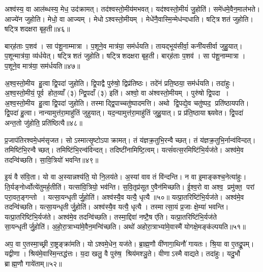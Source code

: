 अश्व॑स्य॒ वा आल॑ब्धस्य॒ मेध॒ उद॑क्रामत्।
तद॑श्वस्तो॒मीय॑मभवत्।
यद॑श्वस्तो॒मीयं॑ जु॒होति॑।
समे॑धमे॒वैन॒माल॑भते।
आज्ये॑न जुहोति।
मेधो॒ वा आज्यम्।
मेधोऽश्वस्तो॒मीयम्।
मेधे॑नै॒वास्मि॒न्मेध॑न्दधाति।
षट्त्रिशतं जुहोति।
षट्त्रिशदक्षरा बृह॒ती॥४६॥

बार्‌ह॑ताः प॒शव॑।
सा प॑शू॒नाम्मात्रा।
प॒शूने॒व मात्र॑या॒ सम॑र्धयति।
तायद्भूय॑सीर्वा॒ कनी॑यसीर्वा जुहु॒यात्।
प॒शून्मात्र॑या॒ व्य॑र्धयेत्।
षट्त्रिशतं जुहोति।
षट्त्रिशदक्षरा बृह॒ती।
बार्‌ह॑ताः प॒शव॑।
सा प॑शू॒नाम्मात्रा।
प॒शूने॒व मात्र॑या॒ सम॑र्धयति॥४७॥

अ॒श्व॒स्तो॒मीय हु॒त्वा द्वि॒पदा॑ जुहोति।
द्वि॒पाद्वै पुरु॑षो॒ द्विप्र॑तिष्ठः।
तदे॑नं प्रति॒ष्ठया॒ सम॑र्धयति।
तदा॑हुः।
अ॒श्व॒स्तो॒मीयं॒ पूर्व होत॒व्याँ (३) न्द्वि॒पदाँ (३) इति॑।
अश्वो॒ वा अ॑श्वस्तो॒मीयम्।
पुरु॑षो द्वि॒पदा।
अ॒श्व॒स्तो॒मीय हु॒त्वा द्वि॒पदा॑ जुहोति।
तस्माद्द्वि॒पाच्चतु॑ष्पादमत्ति।
अथो द्वि॒पद्ये॒व चतु॑ष्पद॒ प्रति॑ष्ठायपति।
द्वि॒पदा॑ हु॒त्वा।
नान्यामुत्त॑रा॒माहु॑तिं जुहुयात्।
यद॒न्यामुत्त॑रा॒माहु॑तिं जुहु॒यात्।
प्र प्र॑ति॒ष्ठायाश्च्यवेत।
द्वि॒पदा॑ अन्त॒तो जु॑होति॒ प्रति॑ष्ठित्यै॥४८॥

प्र॒जाप॑तिरश्वमे॒धम॑सृजत।
सोऽस्मात्सृ॒ष्टोऽपाक्रामत्।
तं य॑ज्ञक्र॒तुभि॒रन्वैच्छत्।
तं य॑ज्ञक्र॒तुभि॒र्नान्व॑विन्दत्।
तमिष्टि॑भि॒रन्वैच्छत्।
तमिष्टि॑भि॒रन्व॑विन्दत्।
तदिष्टी॑नामिष्टि॒त्वम्।
यत्सं॑वत्स॒रमिष्टि॑भि॒र्यज॑ते।
अश्व॑मे॒व तदन्वि॑च्छति।
सा॒वि॒त्रियो॑ भवन्ति॥४९॥

इ॒यं वै स॑वि॒ता।
यो वा अ॒स्यान्नश्य॑ति॒ यो नि॒लय॑ते।
अ॒स्यां वाव तं वि॑न्दन्ति।
न वा इ॒माङ्कश्च॒नेत्या॑हुः।
ति॒र्यङ्नोर्ध्वोत्ये॑तुमर्ह॒तीति॑।
यत्सा॑वि॒त्रियो॒ भव॑न्ति।
स॒वि॒तृप्र॑सूत ए॒वैन॑मिच्छति।
ई॒श्व॒रो वा अश्व॒ प्रमु॑क्त॒ परां परा॒वत॒ङ्गन्तो।
यत्सा॒यन्धृतीर्जु॒होति॑।
अश्व॑स्यै॒व यत्यै॒ धृत्यै॥५०॥ यत्प्रा॒तरिष्टि॑भि॒र्यज॑ते।
अश्व॑मे॒व तदन्वि॑च्छति।
यत्सा॒यन्धृतीर्जु॒होति॑।
अश्व॑स्यै॒व यत्यै॒ धृत्यै।
तस्मात्सा॒यं प्र॒जाः क्षे॒म्या॑ भवन्ति।
यत्प्रा॒तरिष्टि॑भि॒र्यज॑ते।
अश्व॑मे॒व तदन्वि॑च्छति।
तस्मा॒द्दिवा॑ नष्टै॒ष ए॑ति।
यत्प्रा॒तरिष्टि॑भि॒र्यज॑ते सा॒यन्धृतीर्जु॒होति॑।
अ॒हो॒रा॒त्राभ्या॑मे॒वैन॒मन्वि॑च्छति।
अथो॑ अहोरा॒त्राभ्या॑मे॒वास्मै॑ योगक्षे॒मङ्क॑ल्पयति॥५१॥\anuvakamend[भ॒व॒न्ति॒ धृत्या॑ एन॒मन्वि॑च्छ॒त्येकं च]

अप॒ वा ए॒तस्मा॒च्छ्री रा॒ष्ट्रङ्क्रा॑मति।
योऽश्वमे॒धेन॒ यज॑ते।
ब्रा॒ह्म॒णौ वी॑णागा॒थिनौ॑ गायतः।
श्रि॒या वा ए॒तद्रू॒पम्।
यद्वीणा।
श्रिय॑मे॒वास्मि॒न्तद्ध॑त्तः।
य॒दा खलु॒ वै पुरु॑ष॒ श्रिय॑मश्ञु॒ते।
वीणाऽस्मै वाद्यते।
तदा॑हुः।
यदु॒भौ ब्राह्म॒णौ गाये॑ताम्॥५२॥

